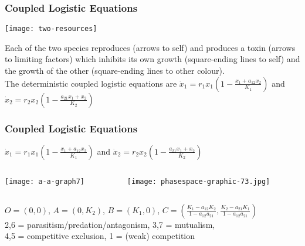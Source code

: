 \documentclass{beamer}
\begin{document}
\begin{frame}
\frametitle{Coupled Logistic Equations}
\begin{center}
	\texttt{[image: two-resources]}
\end{center}
\justifying
\footnotesize{
Each of the two species reproduces (arrows to self) and produces a toxin (arrows to limiting factors) which inhibits its own growth (square-ending lines to self) and the growth of the other (square-ending lines to other colour). \\
}
\pause
The deterministic coupled logistic equations are $\dot{x}_1 = r_1 x_1 \left( 1 - \frac{x_1 + a_{12} x_2}{K_1} \right)$ and $\dot{x}_2 = r_2 x_2 \left( 1 - \frac{a_{21} x_1 + x_2}{K_2} \right)$
\end{frame}


\begin{frame}
\frametitle{Coupled Logistic Equations}
\centering
$\dot{x}_1 = r_1 x_1 \left( 1 - \frac{x_1 + a_{12} x_2}{K_1} \right)$ and $\dot{x}_2 = r_2 x_2 \left( 1 - \frac{a_{21} x_1 + x_2}{K_2} \right)$
\begin{columns}
	\begin{column}{5cm}
		\begin{center}
			\texttt{[image: a-a-graph7]}
		\end{center}
	\end{column}
	\begin{column}{6cm}
		\begin{center}
			\texttt{[image: phasespace-graphic-73.jpg]}
		\end{center}
	\end{column}
\end{columns}
\footnotesize{
$O = (0,0)$, $A = (0,K_2)$, $B = (K_1,0)$, $C = (\frac{K_1-a_{12} K_2}{1-a_{12}a_{21}},\frac{K_2-a_{21} K_1}{1-a_{12}a_{21}})$ \\
2,6 = parasitism/predation/antagonism, 3,7 = mutualism, \\
4,5 = competitive exclusion, 1 = (weak) competition
}
\end{frame}
\end{document}
